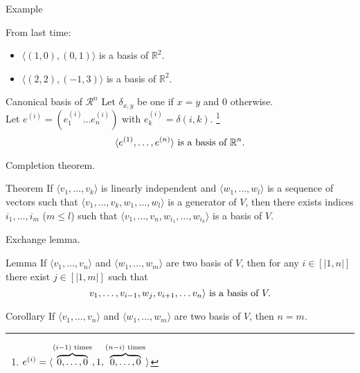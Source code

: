\documentclass{beamer}
\begin{document}
\begin{frame}{Example}
  \begin{exampleblock}{From last time:}
    \begin{itemize}
    \item $\langle (1,0), (0,1) \rangle$ is a basis of $\mathbb{R}^2$.
    \item $\langle (2,2), (-1,3) \rangle$ is a basis of $\mathbb{R}^2$.
    \end{itemize}
  \end{exampleblock}
\end{frame}

\begin{frame}{Canonical basis of $\mathcal{R}^n$}
    Let $\delta_{x,y}$ be one if $x = y$ and $0$ otherwise.\\
    Let $e^{(i)} = (e^{(i)}_1 \dots e^{(i)}_n)$ with $e^{(i)}_k = \delta(i, k)$. \footnote{$e^{(i)} = \langle \overbrace{0,\dots,0}^{(i-1) \textnormal{ times}}, 1, \overbrace{0,\dots,0}^{(n-i) \textnormal{ times}} \rangle$}
    \[\langle e^{(1)}, \dots, e^{(n)} \rangle \textnormal{ is a basis of } \mathbb{R}^n.\]
\end{frame}

\begin{frame}{Completion theorem.}
  \begin{block}{Theorem}
    If $\langle v_1, \dots, v_k \rangle$ is linearly independent and $\langle w_1, \dots, w_l \rangle$ is a sequence of vectors such that $\langle v_1, \dots, v_k, w_1, \dots, w_l \rangle$ is a generator of $V$, then there exists indices $i_1, \dots, i_m$ ($m \le l$) such that $\langle v_1, \dots, v_n, w_{i_1}, \dots, w_{i_k} \rangle$ is a basis of $V$.
  \end{block}
\end{frame}

\begin{frame}{Exchange lemma.}

  \begin{block}{Lemma}
  If $\langle v_1, \dots, v_n \rangle$ and $\langle w_1, \dots, w_m \rangle$ are two basis of $V$, then for any $i \in [|1, n|]$ there exist $j \in [|1, m|]$ such that
  \[v_{1}, \dots, v_{i-1}, w_j, v_{i+1}, \dots v_n \rangle \textnormal{ is a basis of } V.\]
  \end{block}

  \begin{block}{Corollary}
    If $\langle v_1, \dots, v_n \rangle$ and $\langle w_1, \dots, w_m \rangle$ are two basis of $V$, then $n = m$.
  \end{block}
\end{frame}
\end{document}

